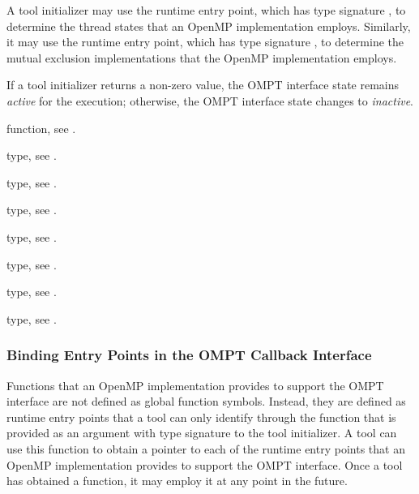 A tool initializer may use the  runtime entry 
point, which has type signature , to determine 
the thread states that an OpenMP implementation employs. Similarly, it may
use the  runtime entry point, which has 
type signature , to determine the mutual
exclusion implementations that the OpenMP implementation employs.

If a tool initializer returns a non-zero value, the OMPT interface state
remains \emph{active} for the execution; otherwise, the OMPT interface state 
changes to \emph{inactive}.

\begin{crossrefs}
\item {} function, see .

\item {} type, see
  .

\item {} type, see .

\item {} type, 
see .

\item {} type, 
see .

\item {} type, 
see .

\item {} type, see .

\item {} type, see .
\end{crossrefs}



\subsubsection{Binding Entry Points in the OMPT Callback Interface}
\label{sec:ompt-bind}

Functions that an OpenMP implementation provides to support the OMPT 
interface are not defined as global function symbols. Instead, they are 
defined as runtime entry points that a tool can only identify through 
the  function that is provided as an argument with type 
signature  to the tool initializer. A tool 
can use this function to obtain a pointer to each of the runtime entry 
points that an OpenMP implementation provides to support the OMPT interface. 
Once a tool has obtained a  function, it may employ it at 
any point in the future.

